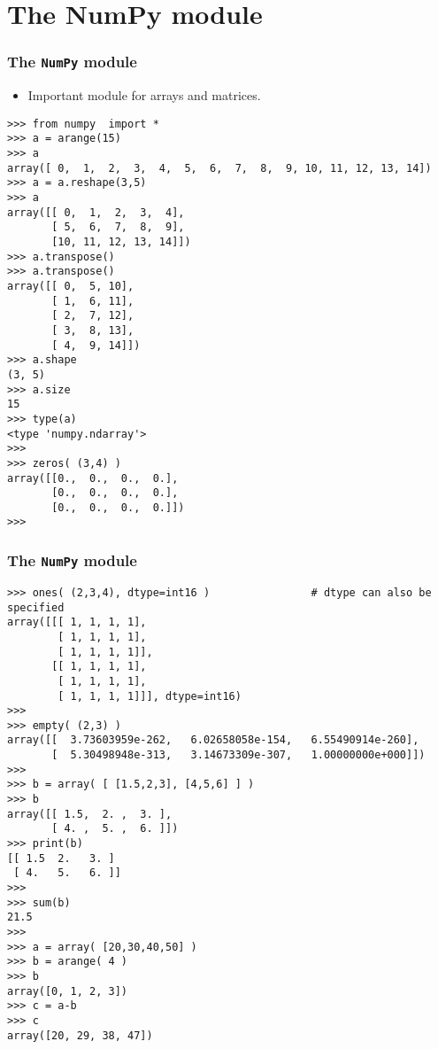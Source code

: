 \documentclass[handout]{beamer}
\numberwithin{equation}{section}
\begin{document}
\section{The NumPy module}

\begin{frame}[fragile]
\frametitle{The {\tt NumPy} module}

\begin{itemize}
\item Important module for arrays and matrices. 
\end{itemize}

\begin{lstlisting}[name=ex2]
>>> from numpy  import *
>>> a = arange(15)
>>> a
array([ 0,  1,  2,  3,  4,  5,  6,  7,  8,  9, 10, 11, 12, 13, 14])
>>> a = a.reshape(3,5)
>>> a
array([[ 0,  1,  2,  3,  4],
       [ 5,  6,  7,  8,  9],
       [10, 11, 12, 13, 14]])
>>> a.transpose()
>>> a.transpose()
array([[ 0,  5, 10],
       [ 1,  6, 11],
       [ 2,  7, 12],
       [ 3,  8, 13],
       [ 4,  9, 14]])
>>> a.shape
(3, 5)
>>> a.size
15
>>> type(a)
<type 'numpy.ndarray'>
>>> 
>>> zeros( (3,4) )
array([[0.,  0.,  0.,  0.],
       [0.,  0.,  0.,  0.],
       [0.,  0.,  0.,  0.]])
>>>
\end{lstlisting}
\end{frame}

\begin{frame}[fragile]
\frametitle{The {\tt NumPy} module}

\begin{lstlisting}[name=ex2]
>>> ones( (2,3,4), dtype=int16 )                # dtype can also be specified
array([[[ 1, 1, 1, 1],
        [ 1, 1, 1, 1],
        [ 1, 1, 1, 1]],
       [[ 1, 1, 1, 1],
        [ 1, 1, 1, 1],
        [ 1, 1, 1, 1]]], dtype=int16)
>>>
>>> empty( (2,3) )
array([[  3.73603959e-262,   6.02658058e-154,   6.55490914e-260],
       [  5.30498948e-313,   3.14673309e-307,   1.00000000e+000]])
>>>       
>>> b = array( [ [1.5,2,3], [4,5,6] ] )
>>> b
array([[ 1.5,  2. ,  3. ],
       [ 4. ,  5. ,  6. ]])
>>> print(b)
[[ 1.5  2.   3. ]
 [ 4.   5.   6. ]]
>>>
>>> sum(b)
21.5
>>>
>>> a = array( [20,30,40,50] )
>>> b = arange( 4 )
>>> b
array([0, 1, 2, 3])
>>> c = a-b
>>> c
array([20, 29, 38, 47])
\end{lstlisting}
\end{frame}
\end{document}
